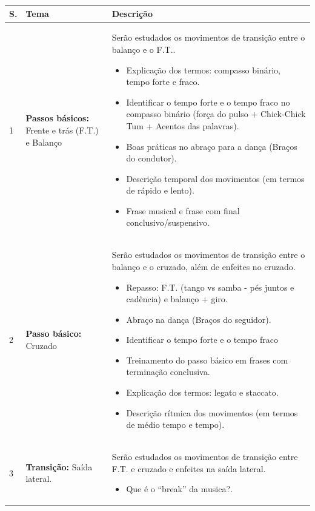 \documentclass[12pt, a4paper]{article}
\begin{document}
\newpage
\begin{longtable}{|p{0.5cm}|p{3.0cm}|p{12.0cm}|}
\hline
S. & Tema & Descrição \\  \hline \hline
1 &  \textbf{Passos básicos:} Frente e trás (F.T.) e Balanço & Serão estudados os movimentos de transição entre o balanço e o F.T.. 
        \begin{itemize}
        \item Explicação dos termos: compasso binário, tempo forte e fraco.
        \item Identificar o tempo forte e o tempo fraco no compasso binário (força do pulso + Chick-Chick Tum + Acentos das palavras).
        \item Boas práticas no abraço para a dança (Braços do condutor). 
        \item Descrição temporal dos movimentos (em termos de rápido e lento).
        \item Frase musical e frase com final conclusivo/suspensivo.
        \end{itemize}
        \\ \hline
2 &  \textbf{Passo básico:} Cruzado &  Serão estudados os movimentos de transição entre o balanço e o cruzado, além de enfeites no cruzado. 
        \begin{itemize}
        \item Repasso: F.T. (tango vs samba - pés juntos e cadência) e balanço + giro. 
        \item Abraço na dança (Braços do seguidor).
        \item Identificar o tempo forte e o tempo fraco
        \item Treinamento do passo básico em frases com terminação conclusiva. 
        \item Explicação dos termos: legato e staccato.
        \item Descrição rítmica dos movimentos (em termos de médio tempo e tempo).
        \end{itemize}
        \\ \hline
3 &  \textbf{Transição:} Saída lateral. &  Serão estudados os movimentos de transição entre F.T. e cruzado e enfeites na saída lateral. 
        \begin{itemize}
        \item Que é o ``break'' da musica?.

\end{itemize}
\end{longtable}
\end{document}

